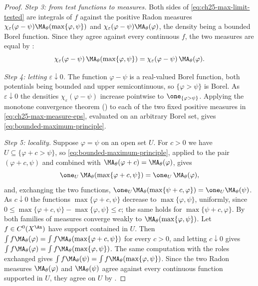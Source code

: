 \begin{proof}
\emph{Step 3: from test functions to measures.}  Both sides of
\eqref{eq:ch25-max-limit-tested} are integrals of $f$ against the positive
Radon measures $\chi_\varepsilon(\varphi-\psi)\MA_\theta(\max\{\varphi,
\psi\})$ and $\chi_\varepsilon(\varphi-\psi)\MA_\theta(\varphi)$, the
density being a bounded Borel function.  Since they agree against every
continuous $f$, the two measures are equal by
:
\begin{equation}
\label{eq:ch25-max-measure-eps}
 \chi_\varepsilon(\varphi-\psi)\,\MA_\theta(\max\{\varphi,\psi\})
 =\chi_\varepsilon(\varphi-\psi)\,\MA_\theta(\varphi) .
\end{equation}

\emph{Step 4: letting $\varepsilon\downarrow0$.}  The function
$\varphi-\psi$ is a real-valued Borel function, both potentials being
bounded and upper semicontinuous, so $\{\varphi>\psi\}$ is Borel.  As
$\varepsilon\downarrow0$ the densities
$\chi_\varepsilon(\varphi-\psi)$ increase pointwise to
$\one_{\{\varphi>\psi\}}$.  Applying the monotone convergence theorem
() to each of the two fixed positive measures in
\eqref{eq:ch25-max-measure-eps}, evaluated on an arbitrary Borel set, gives
\eqref{eq:bounded-maximum-principle}.

\emph{Step 5: locality.}  Suppose $\varphi=\psi$ on an open set $U$.  For
$c>0$ we have $U\subseteq\{\varphi+c>\psi\}$, so
\eqref{eq:bounded-maximum-principle}, applied to the pair
$(\varphi+c,\psi)$ and combined with
$\MA_\theta(\varphi+c)=\MA_\theta(\varphi)$, gives
\[
 \one_{U}\,\MA_\theta(\max\{\varphi+c,\psi\})
 =\one_{U}\,\MA_\theta(\varphi) ,
\]
and, exchanging the two functions,
$\one_U\MA_\theta(\max\{\psi+c,\varphi\})=\one_U\MA_\theta(\psi)$.  As
$c\downarrow0$ the functions $\max\{\varphi+c,\psi\}$ decrease to
$\max\{\varphi,\psi\}$, uniformly, since
$0\leq\max\{\varphi+c,\psi\}-\max\{\varphi,\psi\}\leq c$; the same holds
for $\max\{\psi+c,\varphi\}$.  By  both
families of measures converge weakly to
$\MA_\theta(\max\{\varphi,\psi\})$.  Let $f\in C^0(X^{\An})$ have support
contained in $U$.  Then $\int f\MA_\theta(\varphi)
=\int f\MA_\theta(\max\{\varphi+c,\psi\})$ for every $c>0$, and letting
$c\downarrow0$ gives $\int f\MA_\theta(\varphi)
=\int f\MA_\theta(\max\{\varphi,\psi\})$.  The same computation with the
roles exchanged gives $\int f\MA_\theta(\psi)
=\int f\MA_\theta(\max\{\varphi,\psi\})$.  Since the two Radon measures
$\MA_\theta(\varphi)$ and $\MA_\theta(\psi)$ agree against every
continuous function supported in $U$, they agree on $U$ by
.
\end{proof}

